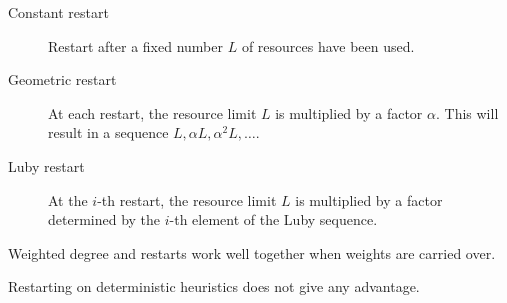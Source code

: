 \begin{description}
\begin{description}
                \begin{description}
                    \item[Constant restart] 
                        Restart after a fixed number $L$ of resources have been used.
                    
                    \item[Geometric restart]  
                        At each restart, the resource limit $L$ is multiplied by a factor $\alpha$.
                        This will result in a sequence $L, \alpha L, \alpha^2 L, \dots$.

                    \item[Luby restart]
                        \phantom{}
                        At the $i$-th restart, the resource limit $L$ is multiplied by a factor determined by the $i$-th element of the Luby sequence.
                \end{description}

                \begin{remark}
                    Weighted degree and restarts work well together when weights are carried over.
                \end{remark}

                \begin{remark}
                    Restarting on deterministic heuristics does not give any advantage.
                \end{remark}
        \end{description}
\end{description}



